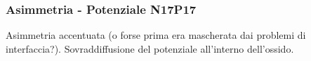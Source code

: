 \begin{frame}
\frametitle{Asimmetria - Potenziale N17P17}
Asimmetria accentuata (o forse prima era mascherata dai problemi di interfaccia?). Sovraddiffusione del potenziale all'interno dell'ossido.
\begin{columns}

\begin{column}{0.3 \textwidth}
\begin{center}
\begin{figure}[!h]
          \end{figure}
\end{center}
\end{column}

\begin{column}{0.3 \textwidth}
\begin{center}
\begin{figure}[!h]
\end{figure}
\end{center}
\end{column}

\begin{column}{0.3 \textwidth}
\begin{center}
\begin{figure}[!h]
\end{figure}
\end{center}
\end{column}

\end{columns}

\end{frame}




